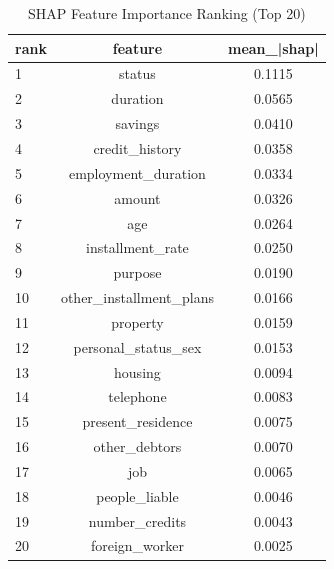\begin{table}
\centering
\caption{SHAP Feature Importance Ranking (Top 20)}
\label{tab:shap_ranking}
\begin{tabular}{lcc}
\toprule
rank & feature & mean_|shap| \\
\midrule
1 & status & 0.1115 \\
2 & duration & 0.0565 \\
3 & savings & 0.0410 \\
4 & credit_history & 0.0358 \\
5 & employment_duration & 0.0334 \\
6 & amount & 0.0326 \\
7 & age & 0.0264 \\
8 & installment_rate & 0.0250 \\
9 & purpose & 0.0190 \\
10 & other_installment_plans & 0.0166 \\
11 & property & 0.0159 \\
12 & personal_status_sex & 0.0153 \\
13 & housing & 0.0094 \\
14 & telephone & 0.0083 \\
15 & present_residence & 0.0075 \\
16 & other_debtors & 0.0070 \\
17 & job & 0.0065 \\
18 & people_liable & 0.0046 \\
19 & number_credits & 0.0043 \\
20 & foreign_worker & 0.0025 \\
\bottomrule
\end{tabular}
\end{table}
